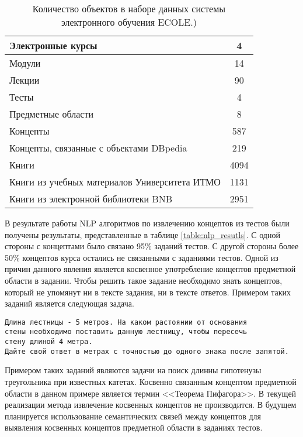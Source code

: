 \begin{table}[h!]
\centering
\caption{Количество объектов в наборе данных системы электронного обучения ECOLE.)}
\label{table:dataset_num}
\begin{tabular}{ |p{9cm}|c|  }
\hline Электронные курсы & 4 \\
\hline Модули & 14 \\
\hline Лекции & 90 \\
\hline Тесты & 4 \\
\hline Предметные области & 8 \\
\hline Концепты & 587 \\
\hline Концепты, связанные с объектами DBpedia & 219 \\
\hline Книги & 4094 \\
\hline Книги из учебных материалов Университета ИТМО & 1131 \\
\hline Книги из электронной библиотеки BNB & 2951 \\
\hline
\end{tabular}
\end{table}


В результате работы NLP алгоритмов по извлечению концептов из тестов были получены результаты, представленные в таблице \ref{table:nlp_resutls}. С одной стороны с концептами было связано 95\% заданий тестов. С другой стороны более 50\% концептов курса остались не связанными с заданиями тестов. Одной из причин данного явления является косвенное употребление концептов предметной области в задании. Чтобы решить такое задание необходимо знать концептов, который не упомянут ни в тексте задания, ни в тексте ответов. Примером таких заданий является следующая задача.

\begin{verbatim}
Длина лестницы - 5 метров. На каком растоянии от основания 
стены необходимо поставить данную лестницу, чтобы пересечь
стену длиной 4 метра. 
Дайте свой ответ в метрах с точностью до одного знака после запятой.
\end{verbatim}


Примером таких заданий являются задачи на поиск длинны гипотенузы треугольника при известных катетах. Косвенно связанным концептом предметной области в данном примере является термин <<Теорема Пифагора>>. В текущей реализации метода извлечение косвенных концептов не производится. В будущем планируется использование семантических связей между концептов для выявления косвенных концептов предметной области в заданиях тестов.

